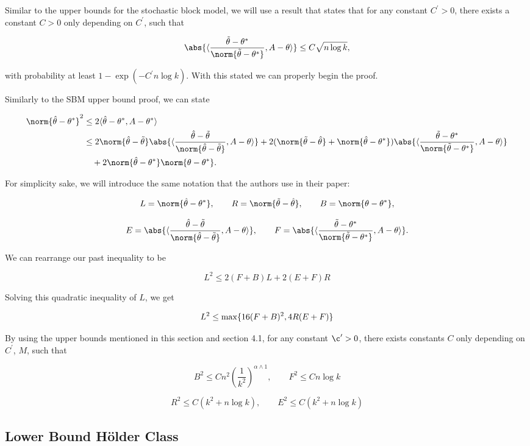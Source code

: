 \documentclass[11pt]{article}
\begin{document}
Similar to the upper bounds for the stochastic block model, we will use a result that states that for any constant $C^\prime > 0$, there exists a constant $C>0$ only depending on $C^\prime$, such that

\[  \abs{\dprod{\frac{\ttheta - \atheta}{\norm{\ttheta-\atheta}}, A-\theta}} \leq C\sqrt{n\log k},  \]

with probability at least $1-\exp(-C^\prime n \log k)$. With this stated we can properly begin the proof. 

Similarly to the SBM upper bound proof, we can state

\begin{align*}
    \norm{\htheta - \atheta}^2 & \leq 2\dprod{\htheta - \atheta, A - \atheta} \\
    & \leq 2\norm{\htheta - \ttheta}\abs{\dprod{\frac{\htheta-\ttheta}{\norm{\htheta-\ttheta}},A-\theta}} + 2(\norm{\ttheta-\htheta} + \norm{\htheta-\atheta})\abs{\dprod{\frac{\ttheta-\atheta}{\norm{\ttheta-\atheta}},A-\theta}} \\
    & \quad + 2\norm{\htheta-\atheta}\norm{\theta-\atheta}.
\end{align*}

For simplicity sake, we will introduce the same notation that the authors use in their paper:

\[ L = \norm{\htheta-\atheta}, \qquad R = \norm{\ttheta-\htheta}, \qquad B = \norm{\theta - \atheta},  \]

\[ E = \abs{\dprod{\frac{\htheta-\ttheta}{\norm{\htheta-\ttheta}},A-\theta}}, \qquad F = \abs{\dprod{\frac{\ttheta-\atheta}{\norm{\ttheta-\atheta}},A-\theta}}.  \]

We can rearrange our past inequality to be

\[ L^2 \leq 2(F+B)L + 2(E+F)R   \]

Solving this quadratic inequality of $L$, we get

\[ L^2 \leq \max\{16(F+B)^2, 4R(E+F)\}  \]

By using the upper bounds mentioned in this section and section 4.1, for any constant $\c^\prime >0$, there exists constants $C$ only depending on $C^\prime$, $M$, such that

\[ B^2 \leq Cn^2 \left(\frac{1}{k^2}\right)^{\alpha \wedge 1}, \qquad F^2 \leq Cn\log k   \]

\[ R^2 \leq C(k^2 + n\log k), \qquad E^2 \leq C(k^2 + n\log k)   \]



\subsection{Lower Bound H\"older Class} \label{sec:lower_hold}



\end{document}
